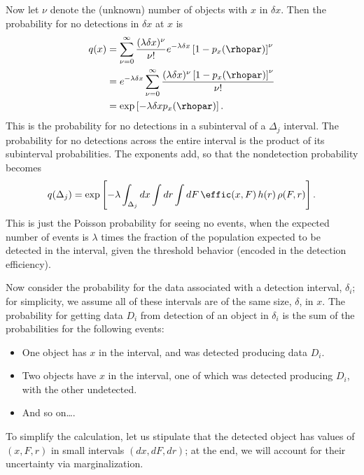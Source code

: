 Now let $\nu$ denote the (unknown) number of objects with $x$ in $\delta x$.
Then the probability for no detections in $\delta x$ at $x$ is
\begin{align}\label{eq:q-exp}
q(x) 
  &= \sum_{\nu=0}^\infty \frac{(\lambda\delta x)^\nu}{\nu!} e^{-\lambda\delta x}
        \left[1 - p_x(\rhopar)\right]^\nu\nonumber\\
  &= e^{-\lambda\delta x} \sum_{\nu=0}^\infty \frac{(\lambda\delta x)^\nu \left[1 - p_x(\rhopar)\right]^\nu}{\nu!}
          \nonumber\\
  &= \exp\left[-\lambda\delta x p_x(\rhopar)\right].
\end{align}
This is the probability for no detections in a subinterval of a $\Delta_j$ interval.
The probability for no detections across the entire interval is the product of its subinterval probabilities.
The exponents add, so that the nondetection probability becomes
\begin{equation}\label{eq:q-def}
q(\Delta_j) = \exp\left[-\lambda\int_{\Delta_j}dx \int dr \int dF\,\effic(x,F)\, h(r)\, \rho(F,r)\right].
\end{equation}
This is just the Poisson probability for seeing no events, when the expected number of events is $\lambda$ times the fraction of the population expected to be detected in the interval, given the threshold behavior (encoded in the detection efficiency).

Now consider the probability for the data associated with a detection interval, $\delta_i$; for simplicity, we assume all of these intervals are of the same size, $\delta$, in $x$.
The probability for getting data $D_i$ from detection of an object in $\delta_i$ is the sum of the probabilities for the following events:
\begin{itemize}
\item One object has $x$ in the interval, and was detected producing data $D_i$.
\item Two objects have $x$ in the interval, one of which was detected producing $D_i$, with the other undetected.
\item And so on\ldots.
\end{itemize}
To simplify the calculation, let us stipulate that the detected object has values of $(x,F,r)$ in small intervals $(dx, dF, dr)$; at the end, we will account for their uncertainty via marginalization.

